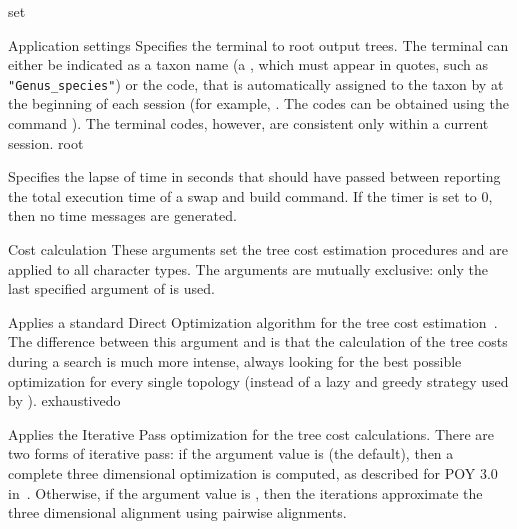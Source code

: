 \begin{command}{set}{}
\begin{arguments}
\begin{argumentgroup}{Application settings}
{Specifies the terminal to root output trees.
The terminal can either be indicated as a taxon name (a
\poystring, which must appear in quotes, such as
\texttt{"Genus\_species"}) or the code, that is automatically
assigned to the taxon by \poy at the beginning of each \poy
session (for example, . The codes can
be obtained using the command ). The
terminal codes, however, are consistent only within a current
session.}
{root}

%            
{Specifies the lapse of time in seconds that should have passed
between reporting the total execution time of a swap and build
command. If the timer is set to 0, then no time messages are
generated.}{}

\end{argumentgroup}

\begin{argumentgroup}{Cost calculation}
{These arguments set the tree cost estimation procedures and are
applied to all character types. The arguments are mutually
exclusive: only the last specified argument of  is
used.}

{Applies a standard Direct Optimization algorithm for the tree
cost estimation~\cite{wheeler1996,wheeler2002a}. The difference 
between this argument and  is
that the calculation of the tree costs during a search is much
more intense, always looking for the best possible optimization 
for every single topology (instead of a lazy and greedy strategy
used by ).}
{exhaustivedo}

{Applies the Iterative Pass optimization for the tree cost
calculations. There are two forms of iterative pass: if the
argument value is  (the default), then a complete three
dimensional optimization is computed, as described for POY 3.0 in~\cite{wheeler2003a}. 
Otherwise, if the argument value is , then the iterations
approximate the three dimensional alignment using pairwise
alignments. 

}
\end{argumentgroup}
\end{arguments}
\end{command}

